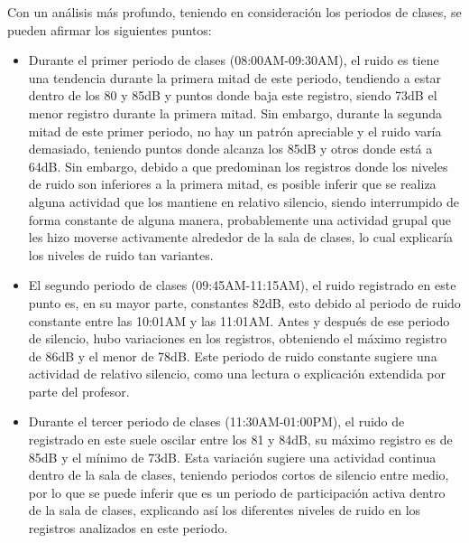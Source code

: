\documentclass{templateNote}
\begin{document}
\begin{tcolorbox}
    Con un análisis más profundo, teniendo en consideración los periodos de clases, se pueden afirmar los siguientes puntos:
    \begin{itemize}
        \item Durante el primer periodo de clases (08:00AM-09:30AM), el ruido es tiene una tendencia durante la primera mitad de este periodo, tendiendo a estar dentro de los 80 y 85dB y puntos donde baja este registro, siendo 73dB el menor registro durante la primera mitad. Sin embargo, durante la segunda mitad de este primer periodo, no hay un patrón apreciable y el ruido varía demasiado, teniendo puntos donde alcanza los 85dB y otros donde está a 64dB. Sin embargo, debido a que predominan los registros donde los niveles de ruido son inferiores a la primera mitad, es posible inferir que se realiza alguna actividad que los mantiene en relativo silencio, siendo interrumpido de forma constante de alguna manera, probablemente una actividad grupal que les hizo moverse activamente alrededor de la sala de clases, lo cual explicaría los niveles de ruido tan variantes.
        \item El segundo periodo de clases (09:45AM-11:15AM), el ruido registrado en este punto es, en su mayor parte, constantes 82dB, esto debido al periodo de ruido constante entre las 10:01AM y las 11:01AM. Antes y después de ese periodo de silencio, hubo variaciones en los registros, obteniendo el máximo registro de 86dB y el menor de 78dB. Este periodo de ruido constante sugiere una actividad de relativo silencio, como una lectura o explicación extendida por parte del profesor.
        \item Durante el tercer periodo de clases (11:30AM-01:00PM), el ruido de registrado en este suele oscilar entre los 81 y 84dB, su máximo registro es de 85dB y el mínimo de 73dB. Esta variación sugiere una actividad continua dentro de la sala de clases, teniendo periodos cortos de silencio entre medio, por lo que se puede inferir que es un periodo de participación activa dentro de la sala de clases, explicando así los diferentes niveles de ruido en los registros analizados en este periodo.
    \end{itemize}
\end{tcolorbox}
\end{document}
